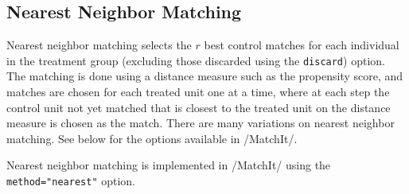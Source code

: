 \documentclass[oneside,letterpaper,titlepage]{article}
\begin{document}
\subsection{Nearest Neighbor Matching}
\label{nearest}

Nearest neighbor matching selects the $r$ best control matches for each
individual in the treatment group (excluding those discarded using the
\texttt{discard}) option.  The matching is done using a distance
measure such as the propensity score, and matches are chosen for each
treated unit one at a time, where at each step the control unit not
yet matched that is closest to the treated unit on the distance
measure is chosen as the match.  There are many variations on nearest
neighbor matching.  See below for the options available in /MatchIt/.

Nearest neighbor matching is implemented in /MatchIt/ using the
\texttt{method="nearest"} option.
\end{document}
